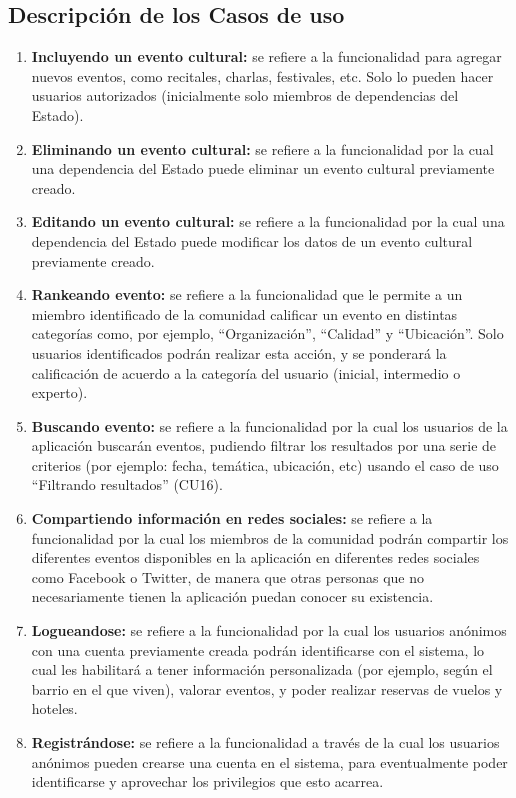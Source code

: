 \subsection{Descripción de los Casos de uso}
\begin{enumerate}
  \item \textbf{Incluyendo un evento cultural:} se refiere a la funcionalidad para agregar nuevos eventos, como recitales, charlas, festivales, etc. Solo lo pueden hacer usuarios autorizados (inicialmente solo miembros de dependencias del Estado).
  \item \textbf{Eliminando un evento cultural:} se refiere a la funcionalidad por la cual una dependencia del Estado puede eliminar un evento cultural previamente creado.
  \item \textbf{Editando un evento cultural:} se refiere a la funcionalidad por la cual una dependencia del Estado puede modificar los datos de un evento cultural previamente creado.
  \item \textbf{Rankeando evento:} se refiere a la funcionalidad que le permite a un miembro identificado de la comunidad calificar un evento en distintas categorías como, por ejemplo, ``Organización'', “Calidad” y “Ubicación”. Solo usuarios identificados podrán realizar esta acción, y se ponderará la calificación de acuerdo a la categoría del usuario (inicial, intermedio o experto).
  \item \textbf{Buscando evento:} se refiere a la funcionalidad por la cual los usuarios de la aplicación buscarán eventos, pudiendo filtrar los resultados por una serie de criterios (por ejemplo: fecha, temática, ubicación, etc) usando el caso de uso ``Filtrando resultados'' (CU16).
  \item \textbf{Compartiendo información en redes sociales:} se refiere a la funcionalidad por la cual los miembros de la comunidad podrán compartir los diferentes eventos disponibles en la aplicación en diferentes redes sociales como Facebook o Twitter, de manera que otras personas que no necesariamente tienen la aplicación puedan conocer su existencia.
  \item \textbf{Logueandose:} se refiere a la funcionalidad por la cual los usuarios anónimos con una cuenta previamente creada podrán identificarse con el sistema, lo cual les habilitará a tener información personalizada (por ejemplo, según el barrio en el que viven), valorar eventos, y poder realizar reservas de vuelos y hoteles.
  \item \textbf{Registrándose:} se refiere a la funcionalidad a través de la cual los usuarios anónimos pueden crearse una cuenta en el sistema, para eventualmente poder identificarse y aprovechar los privilegios que esto acarrea.

\end{enumerate}
